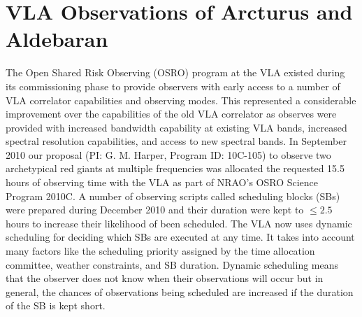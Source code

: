 \section{VLA Observations of Arcturus and Aldebaran}\label{sec:3.6}

The Open Shared Risk Observing (OSRO) program at the VLA existed during its commissioning phase to provide observers with early access to a number of VLA correlator capabilities and observing modes. This represented a considerable improvement over the capabilities of the old VLA correlator as observes were provided with increased bandwidth capability at existing VLA bands, increased spectral resolution capabilities, and access to new spectral bands. In September 2010 our proposal (PI: G. M. Harper, Program ID: 10C-105) to observe two archetypical red giants at multiple frequencies was allocated the requested 15.5 hours of observing time with the VLA as part of NRAO's OSRO Science Program 2010C. A number of observing scripts called scheduling blocks (SBs) were prepared during December 2010 and their duration were kept to $\leq 2.5$ hours to increase their likelihood of been scheduled. The VLA now uses dynamic scheduling for deciding which SBs are executed at any time. It takes into account many factors like the scheduling priority assigned by the time allocation committee, weather constraints, and SB duration. Dynamic scheduling means that the observer does not know when their observations will occur but in general, the chances of observations being scheduled are increased if the duration of the SB is kept short.

